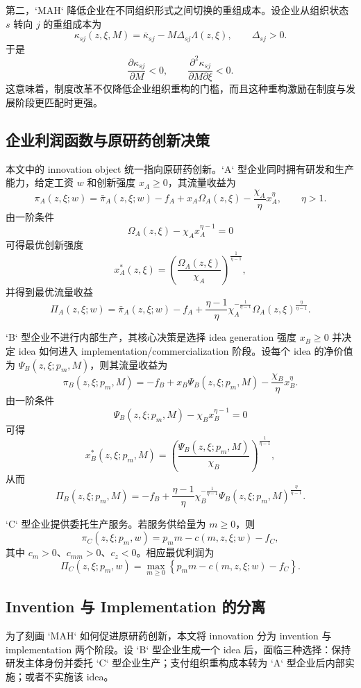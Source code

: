 第二，`MAH` 降低企业在不同组织形式之间切换的重组成本。设企业从组织状态 $s$ 转向 $j$ 的重组成本为
\[
\kappa_{sj}(z,\xi,M)=\bar{\kappa}_{sj}-M\Delta_{sj}\Lambda(z,\xi), \qquad \Delta_{sj}>0.
\]
于是
\[
\frac{\partial \kappa_{sj}}{\partial M}<0,
\qquad
\frac{\partial^{2}\kappa_{sj}}{\partial M\partial \xi}<0.
\]
这意味着，制度改革不仅降低企业组织重构的门槛，而且这种重构激励在制度与发展阶段更匹配时更强。

\subsection{企业利润函数与原研药创新决策}

本文中的 innovation object 统一指向原研药创新。`A` 型企业同时拥有研发和生产能力，给定工资 $w$ 和创新强度 $x_A \ge 0$，其流量收益为
\[
\pi_A(z,\xi;w)
=
\bar{\pi}_A(z,\xi;w)-f_A+x_A\Omega_A(z,\xi)-\frac{\chi_A}{\eta}x_A^{\eta},
\qquad \eta>1.
\]
由一阶条件
\[
\Omega_A(z,\xi)-\chi_A x_A^{\eta-1}=0
\]
可得最优创新强度
\[
x_A^*(z,\xi)
=
\left(\frac{\Omega_A(z,\xi)}{\chi_A}\right)^{\frac{1}{\eta-1}},
\]
并得到最优流量收益
\[
\Pi_A(z,\xi;w)
=
\bar{\pi}_A(z,\xi;w)-f_A
+ \frac{\eta-1}{\eta}\chi_A^{-\frac{1}{\eta-1}}
\Omega_A(z,\xi)^{\frac{\eta}{\eta-1}}.
\]

`B` 型企业不进行内部生产，其核心决策是选择 idea generation 强度 $x_B \ge 0$ 并决定 idea 如何进入 implementation/commercialization 阶段。设每个 idea 的净价值为 $\Psi_B(z,\xi;p_m,M)$，则其流量收益为
\[
\pi_B(z,\xi;p_m,M)
=
-f_B+x_B\Psi_B(z,\xi;p_m,M)-\frac{\chi_B}{\eta}x_B^{\eta}.
\]
由一阶条件
\[
\Psi_B(z,\xi;p_m,M)-\chi_B x_B^{\eta-1}=0
\]
可得
\[
x_B^*(z,\xi;p_m,M)
=
\left(\frac{\Psi_B(z,\xi;p_m,M)}{\chi_B}\right)^{\frac{1}{\eta-1}},
\]
从而
\[
\Pi_B(z,\xi;p_m,M)
=
-f_B+\frac{\eta-1}{\eta}\chi_B^{-\frac{1}{\eta-1}}
\Psi_B(z,\xi;p_m,M)^{\frac{\eta}{\eta-1}}.
\]

`C` 型企业提供委托生产服务。若服务供给量为 $m \ge 0$，则
\[
\pi_C(z,\xi;p_m,w)=p_m m-c(m,z,\xi;w)-f_C,
\]
其中 $c_m>0$、$c_{mm}>0$、$c_z<0$。相应最优利润为
\[
\Pi_C(z,\xi;p_m,w)
=
\max_{m\ge 0}\left\{p_m m-c(m,z,\xi;w)-f_C\right\}.
\]

\subsection{Invention 与 Implementation 的分离}

为了刻画 `MAH` 如何促进原研药创新，本文将 innovation 分为 invention 与 implementation 两个阶段。设 `B` 型企业生成一个 idea 后，面临三种选择：保持研发主体身份并委托 `C` 型企业生产；支付组织重构成本转为 `A` 型企业后内部实施；或者不实施该 idea。

